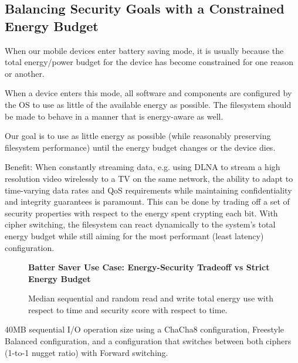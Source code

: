 \subsection{Balancing Security Goals with a Constrained Energy Budget}

When our mobile devices enter battery saving mode, it is usually because the
total energy/power budget for the device has become constrained for one reason
or another.

When a device enters this mode, all software and components are configured by
the OS to use as little of the available energy as possible. The filesystem
should be made to behave in a manner that is energy-aware as well.

Our goal is to use as little energy as possible (while reasonably preserving
filesystem performance) until the energy budget changes or the device dies.

Benefit: When constantly streaming data, e.g. using DLNA to stream a high
resolution video wirelessly to a TV on the same network, the ability to adapt to
time-varying data rates and QoS requirements while maintaining confidentiality
and integrity guarantees is paramount. This can be done by trading off a set of
security properties with respect to the energy spent crypting each bit. With
cipher switching, the filesystem can react dynamically to the system's total
energy budget while still aiming for the most performant (least latency)
configuration.


\begin{figure}[ht] \textbf{Batter Saver Use Case: Energy-Security Tradeoff vs
   Strict Energy Budget}\par\medskip
   \centering
   {} \caption{Median sequential and random
   read and write total energy use with respect to time and security score with
   respect to time.}
  \label{fig:usecase-battery}
\end{figure}

40MB sequential I/O operation size using a ChaCha8 configuration, Freestyle
Balanced configuration, and a configuration that switches between both ciphers
(1-to-1 nugget ratio) with Forward switching.

